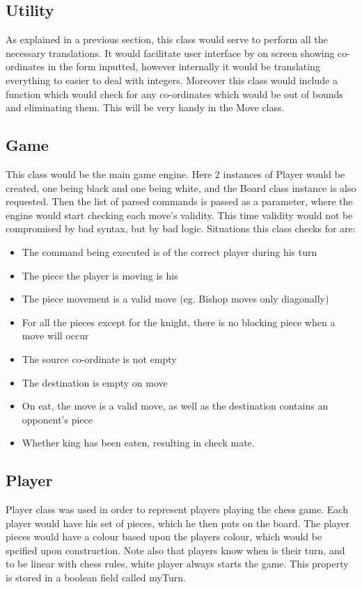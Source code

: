 \documentclass[12pt, A4]{report}
\begin{document}
		\subsection*{Utility}
		As explained in a previous section, this class would serve to perform all the necessary translations. It would facilitate user interface by on screen showing co-ordinates in the form inputted, however internally it would be translating everything to easier to deal with integers. Moreover this class would include a function which would check for any co-ordinates which would be out of bounds and eliminating them. This will be very handy in the Move class.

		\subsection*{Game}
		This class would be the main game engine. Here 2 instances of Player would be created, one being black and one being white, and the Board class instance is also requested. Then the list of parsed commands is passed as a parameter, where the engine would start checking each move's validity. This time validity would not be compromised by bad syntax, but by bad logic. Situations this class checks for are:

			\begin{itemize}
				\item The command being executed is of the correct player during his turn
				\item The piece the player is moving is his
				\item The piece movement is a valid move (eg. Bishop moves only diagonally)
				\item For all the pieces except for the knight, there is no blocking piece when a move will occur
				\item The source co-ordinate is not empty
				\item The destination is empty on move
				\item On eat, the move is a valid move, as well as the destination contains an opponent's piece
				\item Whether king has been eaten, resulting in check mate.
			\end{itemize}

		\subsection*{Player}
		Player class was used in order to represent players playing the chess game. Each player would have his set of pieces, which he then puts on the board. The player pieces would have a colour based upon the players colour, which would be spcified upon construction. Note also that players know when is their turn, and to be linear with chess rules, white player always starts the game. This property is stored in a boolean field called myTurn.
\end{document}
